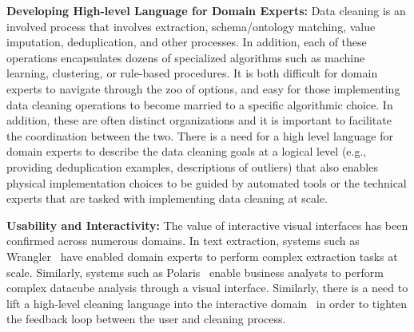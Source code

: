 

\noindent\textbf{Developing High-level Language for Domain Experts:} Data cleaning is an involved process that involves extraction, schema/ontology matching, value imputation, deduplication, and other processes.  In addition, each of these operations encapsulates dozens of specialized algorithms such as machine learning, clustering, or rule-based procedures.  It is both difficult for domain experts to navigate through the zoo of options, and easy for those implementing data cleaning operations to become married to a specific algorithmic choice.  In addition, these are often distinct organizations and it is important to facilitate the coordination between the two.   There is a need for a high level language for domain experts to describe the data cleaning goals at a logical level (e.g., providing deduplication examples, descriptions of outliers) that also enables physical implementation choices to be guided by automated tools or the technical experts that are tasked with implementing data cleaning at scale. {\color{red}{more details?}}


\noindent\textbf{Usability and Interactivity:} The value of interactive visual interfaces has been confirmed across numerous domains.  In text extraction, systems such as Wrangler~\cite{kandel2011wrangler} have enabled domain experts to perform complex extraction tasks at scale.  Similarly, systems such as Polaris~\cite{stolte2002polaris} enable business analysts to perform complex datacube analysis through a visual interface.  Similarly, there is a need to lift a high-level cleaning language into the interactive domain~\cite{heer2015predictive} in order to tighten the feedback loop between the user and cleaning process.

% 


